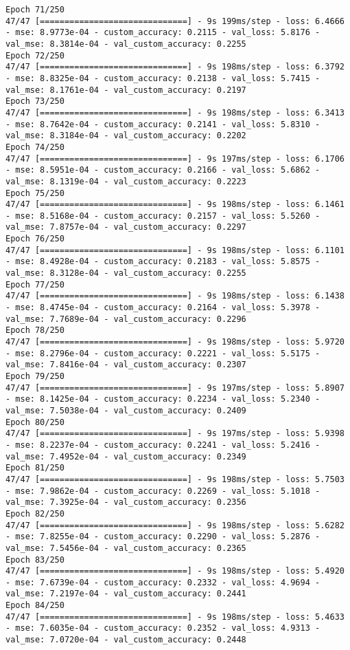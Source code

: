 \begin{lstlisting}
Epoch 71/250
47/47 [==============================] - 9s 199ms/step - loss: 6.4666 - mse: 8.9773e-04 - custom_accuracy: 0.2115 - val_loss: 5.8176 - val_mse: 8.3814e-04 - val_custom_accuracy: 0.2255
Epoch 72/250
47/47 [==============================] - 9s 198ms/step - loss: 6.3792 - mse: 8.8325e-04 - custom_accuracy: 0.2138 - val_loss: 5.7415 - val_mse: 8.1761e-04 - val_custom_accuracy: 0.2197
Epoch 73/250
47/47 [==============================] - 9s 198ms/step - loss: 6.3413 - mse: 8.7642e-04 - custom_accuracy: 0.2141 - val_loss: 5.8310 - val_mse: 8.3184e-04 - val_custom_accuracy: 0.2202
Epoch 74/250
47/47 [==============================] - 9s 197ms/step - loss: 6.1706 - mse: 8.5951e-04 - custom_accuracy: 0.2166 - val_loss: 5.6862 - val_mse: 8.1319e-04 - val_custom_accuracy: 0.2223
Epoch 75/250
47/47 [==============================] - 9s 198ms/step - loss: 6.1461 - mse: 8.5168e-04 - custom_accuracy: 0.2157 - val_loss: 5.5260 - val_mse: 7.8757e-04 - val_custom_accuracy: 0.2297
Epoch 76/250
47/47 [==============================] - 9s 198ms/step - loss: 6.1101 - mse: 8.4928e-04 - custom_accuracy: 0.2183 - val_loss: 5.8575 - val_mse: 8.3128e-04 - val_custom_accuracy: 0.2255
Epoch 77/250
47/47 [==============================] - 9s 198ms/step - loss: 6.1438 - mse: 8.4745e-04 - custom_accuracy: 0.2164 - val_loss: 5.3978 - val_mse: 7.7689e-04 - val_custom_accuracy: 0.2296
Epoch 78/250
47/47 [==============================] - 9s 198ms/step - loss: 5.9720 - mse: 8.2796e-04 - custom_accuracy: 0.2221 - val_loss: 5.5175 - val_mse: 7.8416e-04 - val_custom_accuracy: 0.2307
Epoch 79/250
47/47 [==============================] - 9s 197ms/step - loss: 5.8907 - mse: 8.1425e-04 - custom_accuracy: 0.2234 - val_loss: 5.2340 - val_mse: 7.5038e-04 - val_custom_accuracy: 0.2409
Epoch 80/250
47/47 [==============================] - 9s 197ms/step - loss: 5.9398 - mse: 8.2237e-04 - custom_accuracy: 0.2241 - val_loss: 5.2416 - val_mse: 7.4952e-04 - val_custom_accuracy: 0.2349
Epoch 81/250
47/47 [==============================] - 9s 198ms/step - loss: 5.7503 - mse: 7.9862e-04 - custom_accuracy: 0.2269 - val_loss: 5.1018 - val_mse: 7.3925e-04 - val_custom_accuracy: 0.2356
Epoch 82/250
47/47 [==============================] - 9s 198ms/step - loss: 5.6282 - mse: 7.8255e-04 - custom_accuracy: 0.2290 - val_loss: 5.2876 - val_mse: 7.5456e-04 - val_custom_accuracy: 0.2365
Epoch 83/250
47/47 [==============================] - 9s 198ms/step - loss: 5.4920 - mse: 7.6739e-04 - custom_accuracy: 0.2332 - val_loss: 4.9694 - val_mse: 7.2197e-04 - val_custom_accuracy: 0.2441
Epoch 84/250
47/47 [==============================] - 9s 198ms/step - loss: 5.4633 - mse: 7.6035e-04 - custom_accuracy: 0.2352 - val_loss: 4.9313 - val_mse: 7.0720e-04 - val_custom_accuracy: 0.2448

\end{lstlisting}
